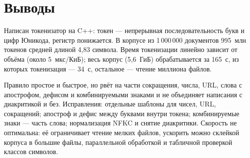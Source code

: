 \section{Выводы}
Написан токенизатор на C++: токен --- непрерывная последовательность букв и цифр Юникода, регистр понижается. В корпусе из 1\,000\,000 документов 995~млн токенов средней длиной 4,83 символа. Время токенизации линейно зависит от объёма (около 5~мкс/КиБ); весь корпус (5,6~ГиБ) обрабатывается за 165~с, из которых токенизация --- 34~с, остальное --- чтение миллиона файлов.

Правило простое и быстрое, но рвёт на части сокращения, числа, URL, слова с апострофом, дефисом и комбинируемыми знаками и не объединяет написания с диакритикой и без. Исправления: отдельные шаблоны для чисел, URL, сокращений; апостроф и дефис между буквами внутри токена; комбинируемые знаки --- часть слова; нормализация NFKC и снятие диакритики. Скорость не оптимальна: её ограничивает чтение мелких файлов, ускорить можно склейкой корпуса в большие файлы, параллельной обработкой и табличной проверкой классов символов.
